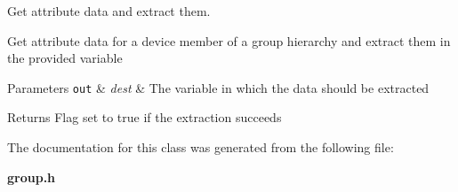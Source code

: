Get attribute data and extract them. 

Get attribute data for a device member of a group hierarchy and extract them in the provided variable


\begin{DoxyParams}[1]{Parameters}
\mbox{\tt out}  & {\em dest} & The variable in which the data should be extracted \\
\hline
\end{DoxyParams}
\begin{DoxyReturn}{Returns}
Flag set to true if the extraction succeeds 
\end{DoxyReturn}


The documentation for this class was generated from the following file\-:\begin{DoxyCompactItemize}
\item 
{\bf group.\-h}\end{DoxyCompactItemize}
